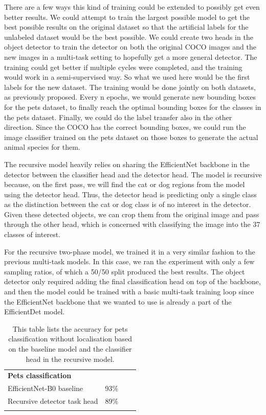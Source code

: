 There are a few ways this kind of training could be extended to possibly get even better results.
We could attempt to train the largest possible model to get the best possible results on the original dataset so that the artificial labels for the unlabeled dataset would be the best possible.
We could create two heads in the object detector to train the detector on both the original COCO images and the new images in a multi-task setting to hopefully get a more general detector.
The training could get better if multiple cycles were completed, and the training would work in a semi-supervised way.
So what we used here would be the first labels for the new dataset.
The training would be done jointly on both datasets, as previously proposed.
Every n epochs, we would generate new bounding boxes for the pets dataset, to finally reach the optimal bounding boxes for the classes in the pets dataset.
Finally, we could do the label transfer also in the other direction.
Since the COCO has the correct bounding boxes, we could run the image classifier trained on the pets dataset on those boxes to generate the actual animal species for them.

The recursive model heavily relies on sharing the EfficientNet backbone in the detector between the classifier head and the detector head.
The model is recursive because, on the first pass, we will find the cat or dog regions from the model using the detector head.
Thus, the detector head is predicting only a single class as the distinction between the cat or dog class is of no interest in the detector.
Given these detected objects, we can crop them from the original image and pass through the other head, which is concerned with classifying the image into the 37 classes of interest.

For the recursive two-phase model, we trained it in a very similar fashion to the previous multi-task models.
In this case, we ran the experiment with only a few sampling ratios, of which a 50/50 split produced the best results.
The object detector only required adding the final classification head on top of the backbone, and then the model could be trained with a basic multi-task training loop since the EfficientNet backbone that we wanted to use is already a part of the EfficientDet model.


\begin{table}[]
    \centering
    \begin{tabular}{lccl}
        \multicolumn{1}{l}{\textbf{Pets classification}}    & \multicolumn{1}{l}{\textbf{}}  \\ \cline{1-2}
        \multicolumn{1}{l}{EfficientNet-B0 baseline} & \multicolumn{1}{c}{93\%}                    \\ \hline
        \multicolumn{1}{l}{Recursive detector task head}       & \multicolumn{1}{c}{89\%}                       \\ \hline
        \\
    \end{tabular}
    \caption{
    This table lists the accuracy for pets classification without localisation based on the baseline model and the classifier head in the recursive model.
    }
\end{table}


